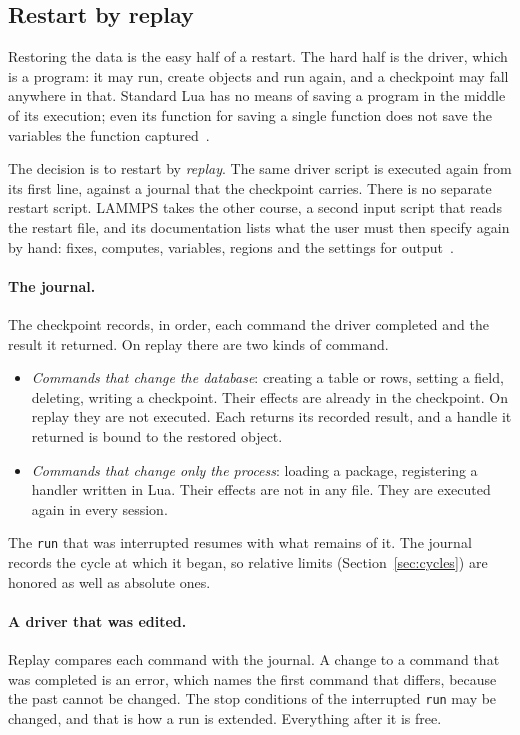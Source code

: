 \documentclass[11pt,a4paper]{article}
\newcommand{\code}[1]{\texttt{#1}}
\begin{document}
\subsection{Restart by replay}
\label{sec:replay}

Restoring the data is the easy half of a restart.  The hard half is the
driver, which is a program: it may run, create objects and run again, and a
checkpoint may fall anywhere in that.  Standard Lua has no means of saving
a program in the middle of its execution; even its function for saving a
single function does not save the variables the function
captured~\cite{lua55}.

The decision is to restart by \emph{replay}.  The same driver script is
executed again from its first line, against a journal that the checkpoint
carries.  There is no separate restart script.  LAMMPS takes the other
course, a second input script that reads the restart file, and its
documentation lists what the user must then specify again by hand: fixes,
computes, variables, regions and the settings for
output~\cite{lammpsrestart}.

\paragraph{The journal.}  The checkpoint records, in order, each command
the driver completed and the result it returned.  On replay there are two
kinds of command.

\begin{itemize}
  \item \emph{Commands that change the database}: creating a table or rows,
        setting a field, deleting, writing a checkpoint.  Their effects are
        already in the checkpoint.  On replay they are not executed.  Each
        returns its recorded result, and a handle it returned is bound to
        the restored object.
  \item \emph{Commands that change only the process}: loading a package,
        registering a handler written in Lua.  Their effects are not in any
        file.  They are executed again in every session.
\end{itemize}

The \code{run} that was interrupted resumes with what remains of it.  The
journal records the cycle at which it began, so relative limits
(Section~\ref{sec:cycles}) are honored as well as absolute ones.

\paragraph{A driver that was edited.}  Replay compares each command with
the journal.  A change to a command that was completed is an error, which
names the first command that differs, because the past cannot be changed.
The stop conditions of the interrupted \code{run} may be changed, and that
is how a run is extended.  Everything after it is free.
\end{document}
